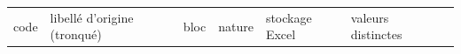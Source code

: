 \documentclass[

  french,

  10pt,

  a4paper,

]{article}
\newcounter{none} %
\begin{document}
{\def\LTcaptype{none} %

\begin{longtable}[]{@{}

  >{\raggedright\arraybackslash}p{}

  >{\raggedright\arraybackslash}p{}

  >{\raggedright\arraybackslash}p{}

  >{\raggedright\arraybackslash}p{}

  >{\raggedright\arraybackslash}p{}

  >{\raggedleft\arraybackslash}p{}

  >{\raggedleft\arraybackslash}p{}@{}}

\toprule\noalign{}

\begin{minipage}[b]{\linewidth}\raggedright

code

\end{minipage} & \begin{minipage}[b]{\linewidth}\raggedright

libellé d'origine (tronqué)

\end{minipage} & \begin{minipage}[b]{\linewidth}\raggedright

bloc

\end{minipage} & \begin{minipage}[b]{\linewidth}\raggedright

nature

\end{minipage} & \begin{minipage}[b]{\linewidth}\raggedright

stockage Excel

\end{minipage} & \begin{minipage}[b]{\linewidth}\raggedleft

valeurs distinctes

\end{minipage} & \begin{minipage}[b]{\linewidth}\raggedleft


\end{minipage}
\end{longtable}}
\end{document}
